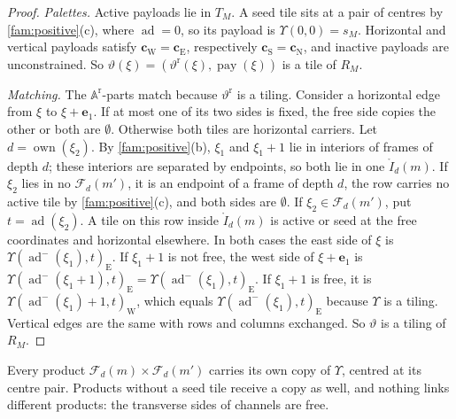 \begin{proof}
\emph{Palettes.} Active payloads lie in $T_M$. A seed tile sits at a pair of centres by \cref{fam:positive}(c), where $\operatorname{ad}=0$, so its payload is $\Upsilon(0,0)=s_M$. Horizontal and vertical payloads satisfy $\mathbf c_{\mathrm W}=\mathbf c_{\mathrm E}$, respectively $\mathbf c_{\mathrm S}=\mathbf c_{\mathrm N}$, and inactive payloads are unconstrained. So $\vartheta(\xi)=(\vartheta^{\mathrm r}(\xi),\operatorname{pay}(\xi))$ is a tile of $R_M$.

\emph{Matching.} The $\mathbb A^{\mathrm r}$-parts match because $\vartheta^{\mathrm r}$ is a tiling. Consider a horizontal edge from $\xi$ to $\xi+\mathbf e_1$. If at most one of its two sides is fixed, the free side copies the other or both are $\emptyset$. Otherwise both tiles are horizontal carriers. Let $d=\operatorname{own}(\xi_2)$. By \cref{fam:positive}(b), $\xi_1$ and $\xi_1+1$ lie in interiors of frames of depth $d$; these interiors are separated by endpoints, so both lie in one $\mathring I_d(m)$. If $\xi_2$ lies in no $\mathcal F_d(m')$, it is an endpoint of a frame of depth $d$, the row carries no active tile by \cref{fam:positive}(c), and both sides are $\emptyset$. If $\xi_2\in\mathcal F_d(m')$, put $t=\operatorname{ad}(\xi_2)$. A tile on this row inside $\mathring I_d(m)$ is active or seed at the free coordinates and horizontal elsewhere. In both cases the east side of $\xi$ is $\Upsilon(\operatorname{ad}^-(\xi_1),t)_{\mathrm E}$. If $\xi_1+1$ is not free, the west side of $\xi+\mathbf e_1$ is $\Upsilon(\operatorname{ad}^-(\xi_1+1),t)_{\mathrm E}=\Upsilon(\operatorname{ad}^-(\xi_1),t)_{\mathrm E}$. If $\xi_1+1$ is free, it is $\Upsilon(\operatorname{ad}^-(\xi_1)+1,t)_{\mathrm W}$, which equals $\Upsilon(\operatorname{ad}^-(\xi_1),t)_{\mathrm E}$ because $\Upsilon$ is a tiling. Vertical edges are the same with rows and columns exchanged. So $\vartheta$ is a tiling of $R_M$.
\end{proof}

Every product $\mathcal F_d(m)\times\mathcal F_d(m')$ carries its own copy of $\Upsilon$, centred at its centre pair. Products without a seed tile receive a copy as well, and nothing links different products: the transverse sides of channels are free.


